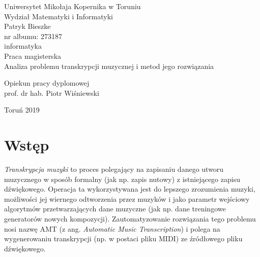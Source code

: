 \documentclass[12pt,a4paper,twoside]{mwart}
\begin{document}
\begin{titlepage}
	\begin{center}
		\large Uniwersytet Mikołaja Kopernika w Toruniu\\
		\large Wydział Matematyki i Informatyki\\
		\vspace{3cm} 
		\large Patryk Bieszke\\
			nr albumu: 273187\\
			informatyka\\
		\vspace{2cm}
		Praca magisterska\\
	
		\vspace{2cm} 
		\huge Analiza problemu transkrypcji muzycznej i metod jego rozwiązania\\
	\end{center}
	\hfill
	\begin{minipage}{6cm}
		\vspace{2cm}
		Opiekun pracy dyplomowej\\
		prof. dr hab. Piotr Wiśniewski
	\end{minipage}
	\vspace{3cm}
	\begin{center}
		Toruń 2019\\
	\end{center}
\end{titlepage}



\clearpage
\thispagestyle{empty}
\mbox{}

\tableofcontents 
\clearpage

\setcounter{secnumdepth}{0}
\section{Wstęp}\label{sec:wstep}
\textit{Transkrypcja muzyki} to proces polegający na zapisaniu danego utworu muzycznego w sposób formalny (jak np. zapis nutowy) z istniejącego zapisu dźwiękowego. Operacja ta wykorzystywana jest do lepszego zrozumienia muzyki, możliwości jej wiernego odtworzenia przez muzyków i jako parametr wejściowy algorytmów przetwarzających dane muzyczne (jak np. dane treningowe generatorów nowych kompozycji). Zautomatyzowanie rozwiązania tego problemu nosi nazwę AMT (z ang. \textit{Automatic Music Transcription}) i polega na wygenerowaniu transkrypcji (np. w postaci pliku MIDI) ze źródłowego pliku dźwiękowego.
\end{document}
